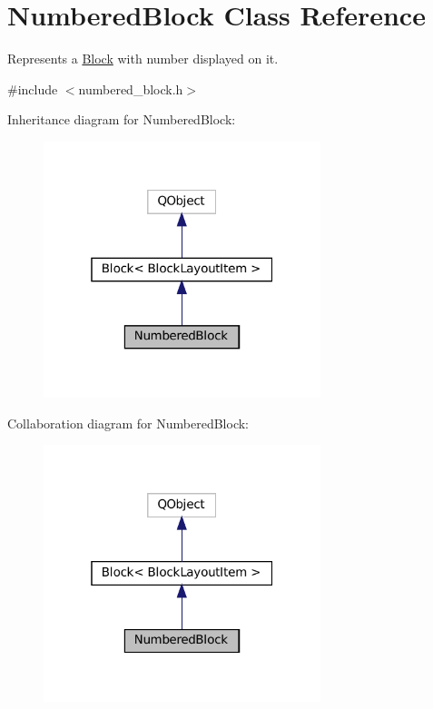 \hypertarget{class_numbered_block}{}\section{Numbered\+Block Class Reference}
\label{class_numbered_block}


Represents a \mbox{\hyperlink{class_block}{Block}} with number displayed on it.  




{\ttfamily \#include $<$numbered\+\_\+block.\+h$>$}



Inheritance diagram for Numbered\+Block\+:
\nopagebreak
\begin{figure}[H]
\begin{center}
\leavevmode
\includegraphics[width=229pt]{class_numbered_block__inherit__graph}
\end{center}
\end{figure}


Collaboration diagram for Numbered\+Block\+:
\nopagebreak
\begin{figure}[H]
\begin{center}
\leavevmode
\includegraphics[width=229pt]{class_numbered_block__coll__graph}
\end{center}
\end{figure}
